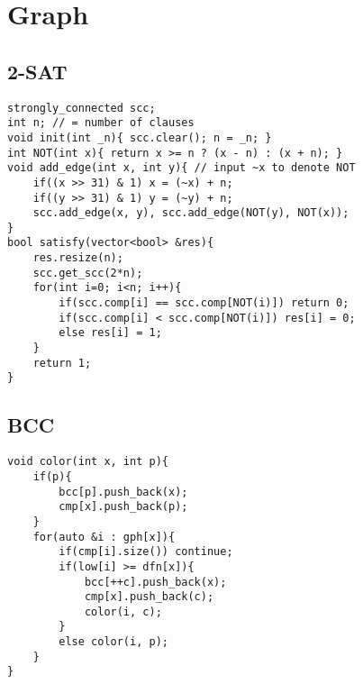 \documentclass[landscape, 8pt, a4paper, oneside,  twocolumn]{extarticle}
\begin{document}
\section{Graph}
\subsection {2-SAT}
\begin{verbatim}
strongly_connected scc;
int n; // = number of clauses
void init(int _n){ scc.clear(); n = _n; }  
int NOT(int x){ return x >= n ? (x - n) : (x + n); }
void add_edge(int x, int y){ // input ~x to denote NOT
	if((x >> 31) & 1) x = (~x) + n;
	if((y >> 31) & 1) y = (~y) + n;
	scc.add_edge(x, y), scc.add_edge(NOT(y), NOT(x));
}
bool satisfy(vector<bool> &res){
	res.resize(n);
	scc.get_scc(2*n);  
	for(int i=0; i<n; i++){
		if(scc.comp[i] == scc.comp[NOT(i)]) return 0;
		if(scc.comp[i] < scc.comp[NOT(i)]) res[i] = 0;
		else res[i] = 1;
	}
	return 1;
}
\end{verbatim}
\subsection {BCC}
\begin{verbatim}
void color(int x, int p){
	if(p){
		bcc[p].push_back(x);
		cmp[x].push_back(p);
	}
	for(auto &i : gph[x]){
		if(cmp[i].size()) continue;
		if(low[i] >= dfn[x]){
			bcc[++c].push_back(x);
			cmp[x].push_back(c);
			color(i, c);
		}
		else color(i, p);
	}
}
\end{verbatim}
\end{document}
